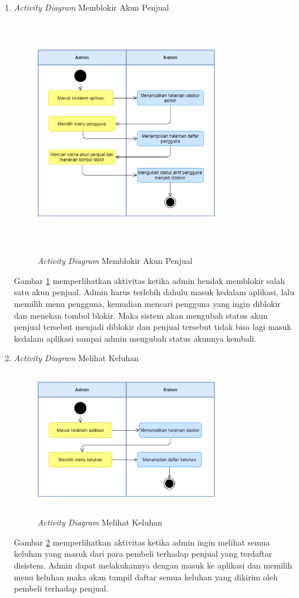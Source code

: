 \begin{enumerate}
	\newpage
	\item \textit{Activity Diagram} Memblokir Akun Penjual
	\begin{figure}[H]
		\centering
		{\includegraphics [width = 8cm, height= 10cm]{gambar/activity diagram/blokir penjual}}
		\caption{\textit{Activity Diagram} Memblokir Akun Penjual}
		\label{blokir penjual}
	\end{figure}
	\par Gambar \ref*{blokir penjual} memperlihatkan aktivitas ketika admin hendak memblokir salah satu akun penjual. Admin harus terlebih dahulu masuk kedalam aplikasi, lalu memilih menu pengguna, kemudian mencari pengguna yang ingin diblokir dan menekan tombol blokir. Maka sistem akan mengubah status akun penjual tersebut menjadi diblokir dan penjual tersebut tidak bisa lagi masuk kedalam aplikasi sampai admin mengubah status akunnya kembali.

	\item \textit{Activity Diagram} Melihat Keluhan
	\begin{figure}[H]
		\centering
		{\includegraphics [width = 8cm, height= 6cm]{gambar/activity diagram/lihat keluhan}}
		\caption{\textit{Activity Diagram} Melihat Keluhan}
		\label{lihat keluhan}
	\end{figure}
	\par Gambar \ref*{lihat keluhan} memperlihatkan aktivitas ketika admin ingin melihat semua keluhan yang masuk dari para pembeli terhadap penjual yang terdaftar disistem. Admin dapat melakukannya dengan masuk ke aplikasi dan memilih menu keluhan maka akan tampil daftar semua keluhan yang dikirim oleh pembeli terhadap penjual.


\end{enumerate}
